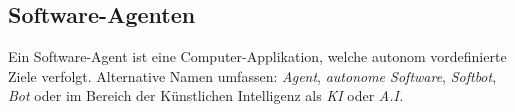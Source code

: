 \subsection{Software-Agenten} %
\label{sub:software_agenten}
Ein Software-Agent ist eine Computer-Applikation, welche autonom vordefinierte Ziele verfolgt. Alternative Namen umfassen: \emph{Agent}, \emph{autonome Software}, \emph{Softbot}, \emph{Bot} oder im Bereich der Künstlichen Intelligenz als \emph{KI} oder \emph{A.I.}
